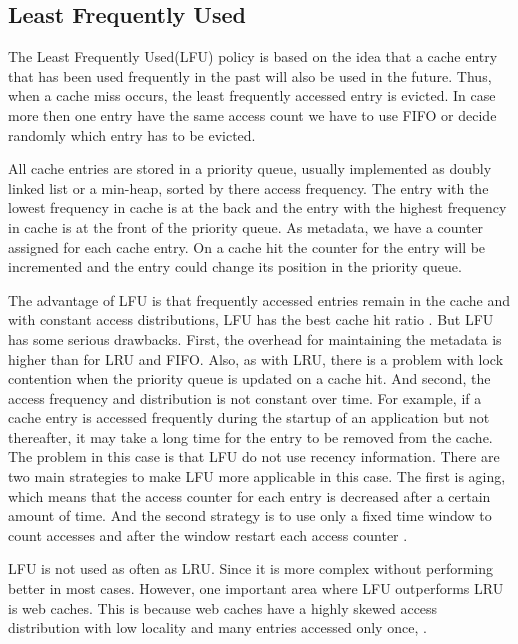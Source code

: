 \documentclass[
	12pt,
	a4paper,
	abstract,
	bibliography=totoc,
	chapterprefix,
	headings=openright,
	numbers=endperiod,
	parskip=half,
	twoside,
]{scrreprt}
\begin{document}
\subsection{Least Frequently Used}

The Least Frequently Used(LFU) policy is based on the idea that a cache entry that has been used frequently in the past will also be used in the future.
Thus, when a cache miss occurs, the least frequently accessed entry is evicted.
In case more then one entry have the same access count we have to use FIFO or decide randomly which entry has to be evicted.

All cache entries are stored in a priority queue, usually implemented as doubly linked list or a min-heap, sorted by there access frequency.
The entry with the lowest frequency in cache is at the back and the entry with the highest frequency in cache is at the front of the priority queue.
As metadata, we have a counter assigned for each cache entry.
On a cache hit the counter for the entry will be incremented and the entry could change its position in the priority queue.

The advantage of LFU is that frequently accessed entries remain in the cache and with constant
access distributions, LFU has the best cache hit ratio \cite{einziger2017tinylfu}.
But LFU has some  serious drawbacks.
First, the overhead for maintaining the metadata is higher than for LRU and FIFO.
Also, as with LRU, there is a problem with lock contention when the priority queue is updated on a cache hit.
And second, the access frequency and distribution is not constant over time.
For example, if a cache entry is accessed frequently during the startup of an application but not thereafter, it may take a long time for the 
entry to be removed from the cache.
The problem in this case is that LFU do not use recency information.
There are two main strategies to make LFU more applicable in this case.
The first is aging, which means that the access counter for each entry is decreased after  a certain amount of time.
And the second strategy is to use only a fixed time window to count accesses and after the window restart each access counter \cite{karakostas2000practical}.

LFU is not used as often as LRU.
Since it is more complex without performing better in most cases.
However, one important area where LFU outperforms LRU is web caches.
This is because web caches have a highly skewed access distribution with low locality and  
many entries accessed only once, \cite{mahanti2000traffic}.
\end{document}
